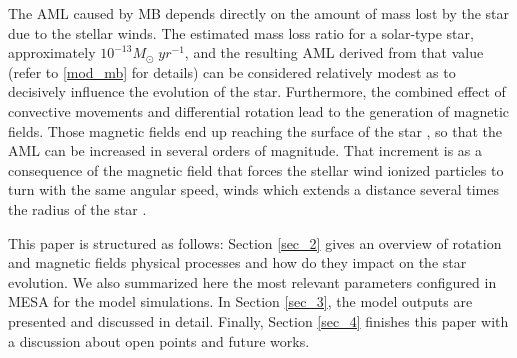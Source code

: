 \documentclass[fleqn,usenatbib]{mnras}
\begin{document}
The AML caused by MB depends directly on the amount of mass lost by the star due to the stellar winds. The estimated mass loss ratio for a solar-type star, approximately $10^{-13}M_{\odot} \; yr^{-1}$, and the resulting AML derived from that value (refer to \ref{mod_mb} for details) can be considered relatively modest as to decisively influence the evolution of the star. Furthermore, the combined effect of convective movements and differential rotation lead to the generation of magnetic fields. Those magnetic fields end up reaching the surface of the star \citep{Langer2012}, so that the AML can be increased in several orders of magnitude. That increment is as a consequence of the magnetic field that forces the stellar wind ionized particles to turn with the same angular speed, winds which extends a distance several times the radius of the star \citep[see][for more details]{UdDoula2002,Ud-Doula2007,Ud-Doula2008}.

This paper is structured as follows: Section \ref{sec_2} gives an overview of rotation and magnetic fields physical processes and how do they impact on the star evolution. We also summarized here the most relevant parameters configured in MESA for the model simulations. In Section \ref{sec_3}, the model outputs are presented and discussed in detail. Finally, Section \ref{sec_4} finishes this paper with a discussion about open points and future works.\par
\end{document}
